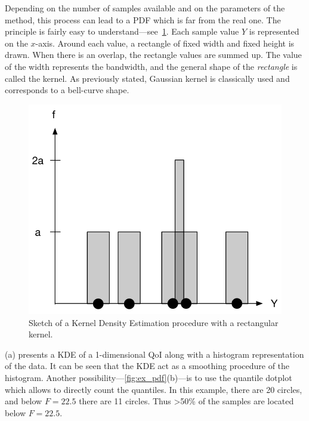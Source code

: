 Depending on the number of samples available and on the parameters of the method, this process can lead to a PDF which is far from the real one. The principle is fairly easy to understand---see~\cref{fig:kde}. Each sample value $Y$ is represented on the $x$-axis. Around each value, a rectangle of fixed width and fixed height is drawn. When there is an overlap, the rectangle values are summed up. The value of the width represents the bandwidth, and the general shape of the \emph{rectangle} is called the kernel. As previously stated, Gaussian kernel is classically used and corresponds to a bell-curve shape.

\begin{figure}[!ht]
\centering
\includegraphics[width=0.6\linewidth,keepaspectratio]{fig/literature/kde.pdf}
\caption{Sketch of a Kernel Density Estimation procedure with a rectangular kernel.}
\label{fig:kde}
\end{figure}

(a) presents a KDE of a 1-dimensional QoI along with a histogram representation of the data. It can be seen that the KDE act as a smoothing procedure of the histogram. Another possibility---\cref{fig:ex_pdf}(b)---is to use the quantile dotplot \cite{kay2016} which allows to directly count the quantiles. In this example, there are 20 circles, and below $F=22.5$ there are 11 circles. Thus >50\% of the samples are located below $F=22.5$.

